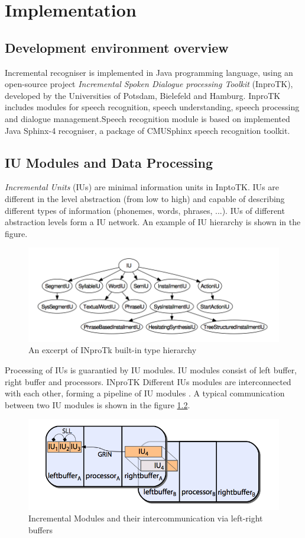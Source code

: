 \chapter{Implementation}
\label{chap:implem}
\section {Development environment overview}
Incremental recogniser is implemented in Java programming language, using
an open-source project \textit {Incremental Spoken Dialogue processing
Toolkit} (InproTK), developed by the Universities of Potsdam, Bielefeld and
Hamburg. InproTK includes modules for speech recognition, speech understanding,
speech processing and dialogue management.Speech recognition module is based on implemented Java Sphinx-4 recogniser, 
a package of CMUSphinx speech recognition toolkit. 
\section {IU Modules and Data Processing}
\textit {Incremental Units} (IUs) are minimal information units in InptoTK.
IUs are different in the level abstraction (from low to high) and capable of
describing different types of information (phonemes, words, phrases, ...). IUs
of different abstraction levels form a IU network. An example of IU hierarchy is
shown in the figure.
\begin{figure}[htbp]
  \centering
    \includegraphics[width=1.0\textwidth]{images/IUs.png}
 \caption{ An excerpt of INproTk built-in type hierarchy \parencite
 {baumann2013:phd}}
  \label{fig:IUs}
\end {figure}
Processing of IUs is guarantied by IU modules. IU
modules consist of left buffer, right buffer and processors.  INproTK Different IUs
modules are interconnected with each other, forming a pipeline of IU modules \parencite {baumann2013:phd}. A typical
communication between two IU modules is shown in the figure \ref{fig:IUs}.
\begin{figure}[htbp]
  \centering
    \includegraphics[width=1.0\textwidth]{images/iuandbuffer.png}
 \caption{ Incremental Modules and their intercommunication via left-right
 buffers \parencite {baumann2013:phd}}
  \label{fig:IUs}
\end {figure}
